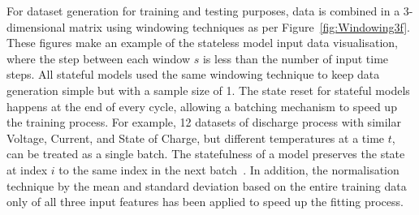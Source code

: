 %
For dataset generation for training and testing purposes, data is combined in a 3-dimensional matrix using windowing techniques as per \mbox{Figure~\ref{fig:Windowing3f}}.
These figures make an example of the stateless model input data visualisation, where the step between each window $s$ is less than the number of input time steps.
All stateful models used the same windowing technique to keep data generation simple but with a sample size of 1.
The state reset for stateful models happens at the end of every cycle, allowing a batching mechanism to speed up the training process.
For example, 12 datasets of discharge process with similar Voltage, Current, and State of Charge, but different temperatures at a time $t$, can be treated as a single batch.
The statefulness of a model preserves the state at index $i$ to the same index in the next batch~\cite{zhu_statefulnes_tfdocs_2020}.
In addition, the normalisation technique by the mean and standard deviation based on the entire training data only of all three input features has been applied to speed up the fitting process.

